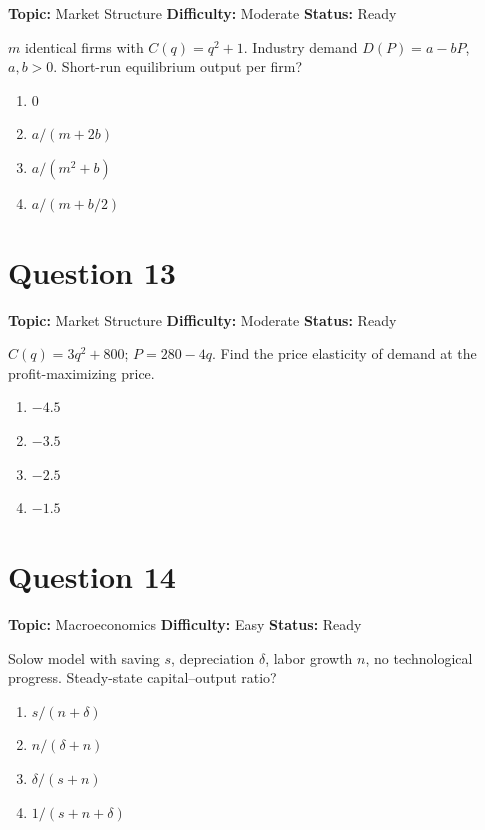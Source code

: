 \documentclass[11pt]{article}
\begin{document}
\noindent\textbf{Topic:} Market Structure \quad \textbf{Difficulty:} Moderate \quad \textbf{Status:} Ready



$m$ identical firms with $C(q) = q^2 + 1$. Industry demand $D(P) = a - bP$, $a,b > 0$.
Short-run equilibrium output per firm?
\begin{enumerate}[label=(\Alph*)]
\item $0$
\item $a/(m + 2b)$
\item $a/(m^2 + b)$
\item $a/(m + b/2)$
\end{enumerate}

\newpage

\section*{Question 13}


\noindent\textbf{Topic:} Market Structure \quad \textbf{Difficulty:} Moderate \quad \textbf{Status:} Ready



$C(q) = 3q^2 + 800$; $P = 280 - 4q$. Find the price elasticity of demand at the
profit-maximizing price.
\begin{enumerate}[label=(\Alph*)]
\item $-4.5$
\item $-3.5$
\item $-2.5$
\item $-1.5$
\end{enumerate}

\newpage

\section*{Question 14}


\noindent\textbf{Topic:} Macroeconomics \quad \textbf{Difficulty:} Easy \quad \textbf{Status:} Ready



Solow model with saving $s$, depreciation $\delta$, labor growth $n$, no technological progress.
Steady-state capital--output ratio?
\begin{enumerate}[label=(\Alph*)]
\item $s/(n + \delta)$
\item $n/(\delta + n)$
\item $\delta/(s + n)$
\item $1/(s + n + \delta)$
\end{enumerate}
\end{document}
